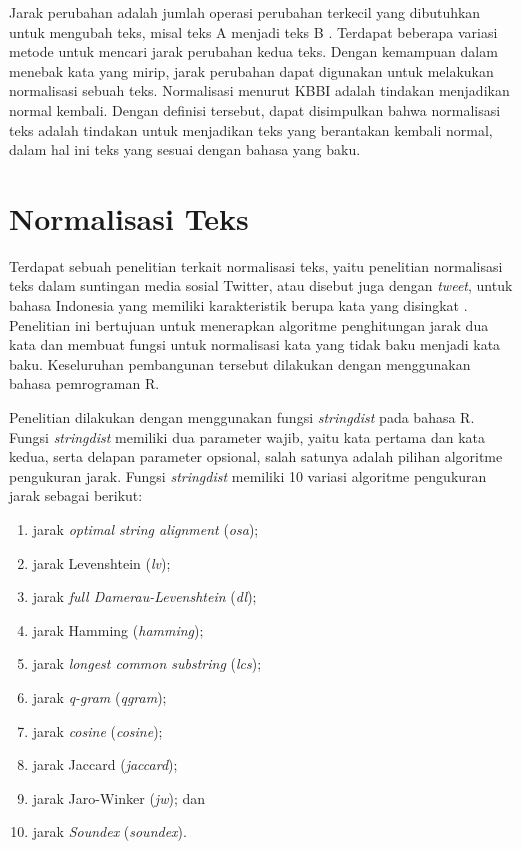 Jarak perubahan adalah jumlah operasi perubahan terkecil yang dibutuhkan untuk mengubah teks, misal teks A menjadi teks B \parencite{schutze2008introduction}. Terdapat beberapa variasi metode untuk mencari jarak perubahan kedua teks. Dengan kemampuan dalam menebak kata yang mirip, jarak perubahan dapat digunakan untuk melakukan normalisasi sebuah teks. Normalisasi menurut KBBI \parencite{kbbi} adalah tindakan menjadikan normal kembali. Dengan definisi tersebut, dapat disimpulkan bahwa normalisasi teks adalah tindakan untuk menjadikan teks yang berantakan kembali normal, dalam hal ini teks yang sesuai dengan bahasa yang baku.

\section{Normalisasi Teks}

Terdapat sebuah penelitian terkait normalisasi teks, yaitu penelitian normalisasi teks dalam suntingan media sosial Twitter, atau disebut juga dengan \textit{tweet}, untuk bahasa Indonesia yang memiliki karakteristik berupa kata yang disingkat \parencite{saragih2017normalisasi}. Penelitian ini bertujuan untuk menerapkan algoritme penghitungan jarak dua kata dan membuat fungsi untuk normalisasi kata yang tidak baku menjadi kata baku. Keseluruhan pembangunan tersebut dilakukan dengan menggunakan bahasa pemrograman R.

Penelitian dilakukan dengan menggunakan fungsi \textit{stringdist} pada bahasa R. Fungsi \textit{stringdist} memiliki dua parameter wajib, yaitu kata pertama dan kata kedua, serta delapan parameter opsional, salah satunya adalah pilihan algoritme pengukuran jarak. Fungsi \textit{stringdist} memiliki 10 variasi algoritme pengukuran jarak sebagai berikut:
\begin{enumerate}
	\item jarak \textit{optimal string alignment} (\textit{osa});
	\item jarak Levenshtein (\textit{lv});
	\item jarak \textit{full Damerau-Levenshtein} (\textit{dl});
	\item jarak Hamming (\textit{hamming});
	\item jarak \textit{longest common substring} (\textit{lcs});
	\item jarak \textit{q-gram} (\textit{qgram});
	\item jarak \textit{cosine} (\textit{cosine});
	\item jarak Jaccard (\textit{jaccard});
	\item jarak Jaro-Winker (\textit{jw}); dan
	\item jarak \textit{Soundex} (\textit{soundex}).
\end{enumerate}

